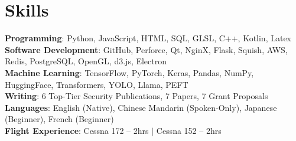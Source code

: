 \section{Skills}
 \begin{itemize}[leftmargin=0.5cm, label={}]
    \small{\item{
     \textbf{Programming}{: Python, JavaScript, HTML, SQL, GLSL, C++, Kotlin, Latex} \\\vspace{1pt}
     \textbf{Software Development}{: GitHub, Perforce, Qt, NginX, Flask, Squish, AWS, Redis, PostgreSQL, OpenGL, d3.js, Electron} \\\vspace{1pt}
     \textbf{Machine Learning}{: TensorFlow, PyTorch, Keras, Pandas, NumPy, HuggingFace, Transformers, YOLO, Llama, PEFT} \\\vspace{1pt}
     \textbf{Writing}{: 6 Top-Tier Security Publications, 7 Papers, 7 Grant Proposals} \\\vspace{1pt}
     \textbf{Languages}{: English (Native), Chinese Mandarin (Spoken-Only), Japanese (Beginner), French (Beginner)} \\\vspace{1pt}
     \textbf{Flight Experience}{: Cessna 172 -- 2hrs $|$ Cessna 152 -- 2hrs} \\\vspace{1pt}
    }}
 \end{itemize}